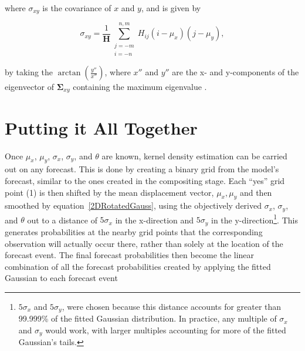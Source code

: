 \noindent where $\sigma_{xy}$ is the covariance of $x$ and $y$, and is given by

    \begin{equation}
        \label{sigmaxy}
        \sigma_{xy} = \frac{1}{\mathbf{H}} \sum\limits_{\substack{j=-m \\ i=-n}}^{n,m}H_{ij}(i - \mu_x)(j - \mu_y),
    \end{equation}

\noindent by taking the $\arctan{\left(\frac{y''}{x''}\right)}$, where $x''$ and $y''$ are the x- and y-components of the eigenvector of $\boldsymbol{\Sigma}_{xy}$ containing the maximum eigenvalue \citep{Lak2010}.




\section{Putting it All Together}
\label{kde}

Once $\mu_x$, $\mu_y$, $\sigma_x$, $\sigma_y$, and $\theta$ are known, kernel density estimation can be carried out on any forecast. This is done by creating a binary grid from the model's forecast, similar to the ones created in the compositing stage.  Each ``yes'' grid point (1) is then shifted by the mean displacement vector, ${\mu_x, \mu_y}$ and then smoothed by \mbox{equation \ref{2DRotatedGauss}}, using the objectively derived $\sigma_x$, $\sigma_y$, and $\theta$ out to a distance of $5\sigma_x$ in the x-direction and $5\sigma_y$ in the y-direction\footnote{$5\sigma_x$ and $5\sigma_y$, were chosen because this distance accounts for greater than 99.999\% of the fitted Gaussian distribution. In practice, any multiple of $\sigma_x$ and $\sigma_y$ would work, with larger multiples accounting for more of the fitted Gaussian's tails.}. This generates probabilities at the nearby grid points that the corresponding observation will actually occur there, rather than solely at the location of the forecast event. The final forecast probabilities then become the linear combination of all the forecast probabilities created by applying the fitted Gaussian to each forecast event







